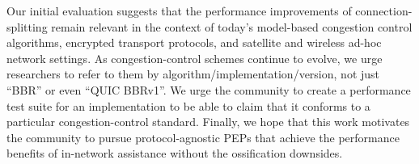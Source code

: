 

\noindent Our initial evaluation suggests that the performance improvements of
connection-splitting remain relevant in the context of today's model-based
congestion control algorithms, encrypted transport protocols, and satellite and
wireless ad-hoc network settings. As congestion-control schemes continue to
evolve, we urge researchers to refer to them by
algorithm/implementation/version, not just ``BBR'' or even ``QUIC BBRv1''. We
urge the community to create a performance test suite for an implementation to
be able to claim that it conforms to a particular congestion-control standard.
Finally, we hope that this work motivates the community to pursue
protocol-agnostic PEPs that achieve the performance benefits of in-network
assistance without the ossification downsides.

